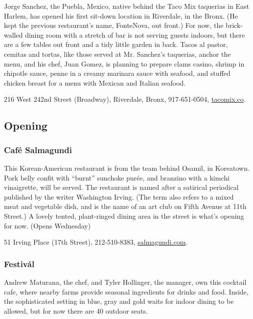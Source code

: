 Jorge Sanchez, the Puebla, Mexico, native behind the Taco Mix taquerias
in East Harlem, has opened his first sit-down location in Riverdale, in
the Bronx. (He kept the previous restaurant's name, FonteNova, out
front.) For now, the brick-walled dining room with a stretch of bar is
not serving guests indoors, but there are a few tables out front and a
tidy little garden in back. Tacos al pastor, cemitas and tortas, like
those served at Mr. Sanchez's taquerias, anchor the menu, and his chef,
Juan Gomez, is planning to prepare clams casino, shrimp in chipotle
sauce, penne in a creamy marinara sauce with seafood, and stuffed
chicken breast for a menu with Mexican and Italian seafood.

216 West 242nd Street (Broadway), Riverdale, Bronx, 917-651-0504,
\href{https://www.tacomix.co/}{tacomix.co}.

\hypertarget{opening}{%
\subsection{Opening}\label{opening}}

\hypertarget{cafuxe9-salmagundi}{%
\subsubsection{Café Salmagundi}\label{cafuxe9-salmagundi}}

This Korean-American restaurant is from the team behind Osamil, in
Koreatown. Pork belly confit with ``burnt'' sunchoke purée, and branzino
with a kimchi vinaigrette, will be served. The restaurant is named after
a satirical periodical published by the writer Washington Irving. (The
term also refers to a mixed meat and vegetable dish, and is the name of
an art club on Fifth Avenue at 11th Street.) A lovely tented,
plant-ringed dining area in the street is what's opening for now. (Opens
Wednesday)

51 Irving Place (17th Street), 212-510-8383,
\href{http://salmagundi.com}{salmagundi.com}.

\hypertarget{festivuxe1l}{%
\subsubsection{Festivál}\label{festivuxe1l}}

Andrew Maturana, the chef, and Tyler Hollinger, the manager, own this
cocktail cafe, where nearby farms provide seasonal ingredients for
drinks and food. Inside, the sophisticated setting in blue, gray and
gold waits for indoor dining to be allowed, but for now there are 40
outdoor seats.

